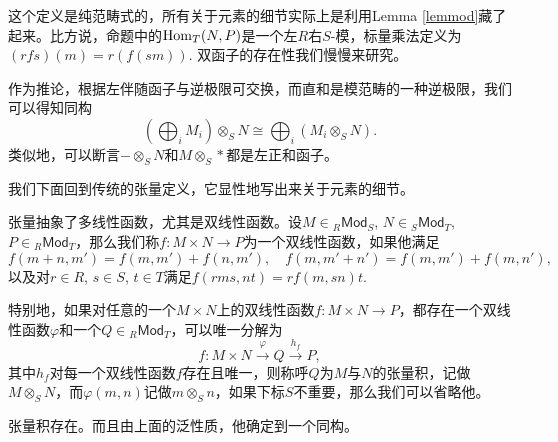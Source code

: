 这个定义是纯范畴式的，所有关于元素的细节实际上是利用Lemma \ref{lemmod}藏了起来。比方说，命题中的$\operatorname{Hom}_{T}(N,P)$是一个左$R$右$S$-模，标量乘法定义为$(rfs)(m)=r(f(sm))$. 双函子的存在性我们慢慢来研究。

作为推论，根据左伴随函子与逆极限可交换，而直和是模范畴的一种逆极限，我们可以得知同构
\[
	\left(\bigoplus_i M_i\right)\otimes_S N\cong \bigoplus_i \left(M_i\otimes_S N\right).
\]
类似地，可以断言$-\otimes_S N$和$M\otimes_S *$都是左正和函子。

我们下面回到传统的张量定义，它显性地写出来关于元素的细节。

\para 张量抽象了多线性函数，尤其是双线性函数。设$M\in {}_R\mathsf{Mod}_S$, $N\in {}_S\mathsf{Mod}_T$, $P\in {}_R\mathsf{Mod}_T$，那么我们称$f:M\times N\to P$为一个双线性函数，如果他满足
\[
	f(m+n,m')=f(m,m')+f(n,m'),\quad f(m,m'+n')=f(m,m')+f(m,n'),
\]
以及对$r\in R$, $s\in S$, $t\in T$满足$f(rms,nt)=rf(m,sn)t$. 

特别地，如果对任意的一个$M\times N$上的双线性函数$f:M\times N\to P$，都存在一个双线性函数$\varphi$和一个$Q\in {}_R\mathsf{Mod}_T$，可以唯一分解为
\[
	f:M\times N\xrightarrow{\varphi} Q\xrightarrow{h_f}P,
\]
其中$h_f$对每一个双线性函数$f$存在且唯一，则称呼$Q$为$M$与$N$的张量积，记做$M\otimes_S N$，而$\varphi(m,n)$记做$m\otimes_S n$，如果下标$S$不重要，那么我们可以省略他。


\begin{lem}
张量积存在。而且由上面的泛性质，他确定到一个同构。
\end{lem}

